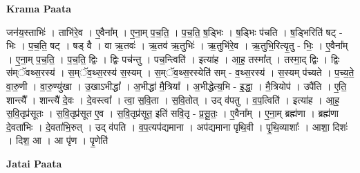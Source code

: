 \documentclass[17pt]{extarticle}
\begin{document}
\textbf{Krama Paata} \newline

जन॑य॒स्ताभिः॑ । ताभि॑रे॒व । ए॒वैना᳚म् । ए॒ना॒म् प॒च॒ति॒ । प॒च॒ति॒ ष॒ड्भिः । ष॒ड्भिः प॑चति । ष॒ड्भिरिति॑ षट् - भिः । प॒च॒ति॒ षट् । षड् वै । वा ऋ॒तवः॑ । ऋ॒तव॑ ऋ॒तुभिः॑ । ऋ॒तुभि॑रे॒व । ऋ॒तुभि॒रित्यृ॒तु - भिः॒ । ए॒वैना᳚म् । ए॒ना॒म् प॒च॒ति॒ । प॒च॒ति॒ द्विः । द्विः पच॑न्तु । पच॒न्त्विति॑ । इत्या॑ह । आ॒ह॒ तस्मा᳚त् । तस्मा॒द् द्विः । द्विः स॑म्ॅवथ्स॒रस्य॑ । स॒म्ॅव॒थ्स॒रस्य॑ स॒स्यम् । स॒म्ॅव॒थ्स॒रस्येति॑ सम् - व॒थ्स॒रस्य॑ । स॒स्यम् प॑च्यते । प॒च्य॒ते॒ वा॒रु॒णी । वा॒रु॒ण्यु॑खा । उ॒खाऽभीद्धा᳚ । अ॒भीद्धा॑ मै॒त्रिया᳚ । अ॒भीद्धेत्य॒भि - इ॒द्धा॒ । मै॒त्रियोप॑ । उपै॑ति । ए॒ति॒ शान्त्यै᳚ । शान्त्यै॑ दे॒वः । दे॒वस्त्वा᳚ । त्वा॒ स॒वि॒ता । स॒वि॒तोत् । उद् व॑पतु । व॒प॒त्विति॑ । इत्या॑ह । आ॒ह॒ स॒वि॒तृप्र॑सूतः । स॒वि॒तृप्र॑सूत ए॒व । स॒वि॒तृप्र॑सूत॒ इति॑ सवि॒तृ - प्र॒सू॒तः॒ । ए॒वैना᳚म् । ए॒ना॒म् ब्रह्म॑णा । ब्रह्म॑णा दे॒वता॑भिः । दे॒वता॑भि॒रुत् । उद् व॑पति । व॒प॒त्यप॑द्यमाना । अप॑द्यमाना पृथि॒वी । पृ॒थि॒व्याशाः᳚ । आशा॒ दिशः॑ । दिश॒ आ । आ पृ॑ण । पृ॒णेति॑ \newline

\textbf{Jatai Paata} \newline
\end{document}

